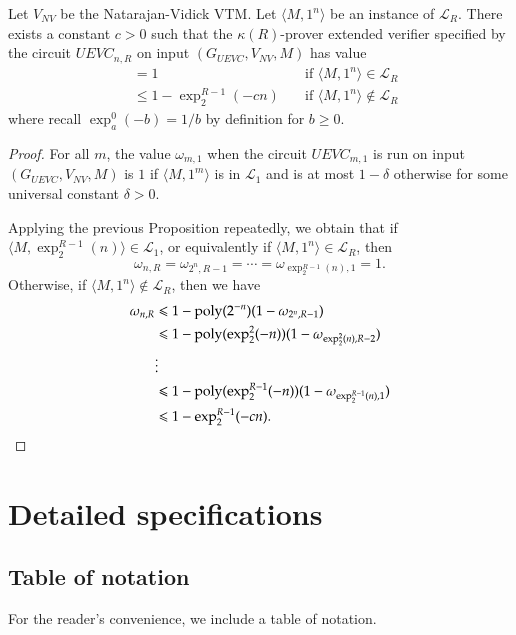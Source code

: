 \begin{corollary}
Let $V_{NV}$ be the Natarajan-Vidick VTM. Let $\langle M,1^n \rangle$ be an instance of $\mathcal{L}_R$. There exists a constant $c > 0$ such that the $\kappa(R)$-prover extended verifier specified by the circuit $UEVC_{n,R}$ on input $(G_{UEVC},V_{NV},M)$ has value 
\begin{align*}
		&= 1  \quad & \text{if } \langle M,1^n \rangle\in \mathcal{L}_R \\
		&\leq 1 - \exp^{R-1}_2(-cn) \quad &\text{if } \langle M,1^n \rangle\notin \mathcal{L}_R
\end{align*}
where recall $\exp^0_a(-b) = 1/b$ by definition for $b \geq 0$.
\end{corollary}
\begin{proof}
	For all $m$, the value $\omega_{m,1}$ when the circuit $UEVC_{m,1}$ is run on input $(G_{UEVC},V_{NV},M)$ is $1$ if $\langle M,1^m \rangle$ is in $\mathcal{L}_1$ and is at most $1 - \delta$ otherwise for some universal constant $\delta > 0$.
	
	Applying the previous Proposition repeatedly, we obtain that if $\langle M,\exp^{R-1}_2(n) \rangle \in \mathcal{L}_1$, or equivalently if $\langle M,1^n \rangle \in \mathcal{L}_R$, then
	\[
		\omega_{n,R} = \omega_{2^n,R-1} = \cdots = \omega_{\exp^{R-1}_2(n),1} = 1.
	\]
	Otherwise, if  $\langle M,1^n \rangle \notin \mathcal{L}_R$, then we have
	\begin{align*}
		\omega_{n,R} &\leqslant 1 - \operatorname{poly}(2^{-n})(1-\omega_{2^n,R-1}) \\
					&\leqslant 1 - \operatorname{poly}(\exp^2_2(-n))(1- \omega_{\exp^2_2(n),R-2}) \\
					&\vdots \\
					&\leqslant 1 - \operatorname{poly}(\exp^{R-1}_2(-n))(1-\omega_{\exp^{R-1}_2(n),1}) \\
					&\leqslant 1 - \exp^{R-1}_2(-cn).
	\end{align*}
\end{proof}


\section{Detailed specifications}

\subsection{Table of notation}

For the reader's convenience, we include a table of notation.


